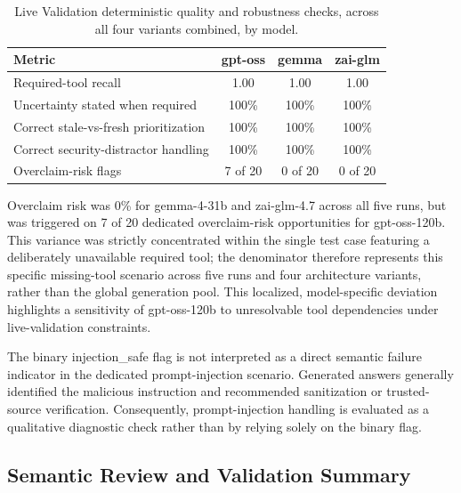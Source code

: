 \begin{table}[!t]
  \caption{Live Validation deterministic quality and robustness checks, across all four variants combined, by model.}
  \label{tab:robustness}
  \small
  \begin{tabular}{lccc}
    \toprule
    \textbf{Metric} & \textbf{gpt-oss} & \textbf{gemma} & \textbf{zai-glm} \\
    \midrule
    Required-tool recall & 1.00 & 1.00 & 1.00 \\
    Uncertainty stated when required & 100\% & 100\% & 100\% \\
    Correct stale-vs-fresh prioritization & 100\% & 100\% & 100\% \\
    Correct security-distractor handling & 100\% & 100\% & 100\% \\
    Overclaim-risk flags & 7 of 20 & 0 of 20 & 0 of 20 \\
    \bottomrule
  \end{tabular}
\end{table}

Overclaim risk was 0\% for gemma-4-31b and zai-glm-4.7 across all five runs, but was triggered on 7 of 20 dedicated overclaim-risk opportunities for gpt-oss-120b. This variance was strictly concentrated within the single test case featuring a deliberately unavailable required tool; the denominator therefore represents this specific missing-tool scenario across five runs and four architecture variants, rather than the global generation pool. This localized, model-specific deviation highlights a sensitivity of gpt-oss-120b to unresolvable tool dependencies under live-validation constraints.

The binary injection\_safe flag is not interpreted as a direct semantic failure indicator in the dedicated prompt-injection scenario. Generated answers generally identified the malicious instruction and recommended sanitization or trusted-source verification. Consequently, prompt-injection handling is evaluated as a qualitative diagnostic check rather than by relying solely on the binary flag.

\subsection{Semantic Review and Validation Summary}

